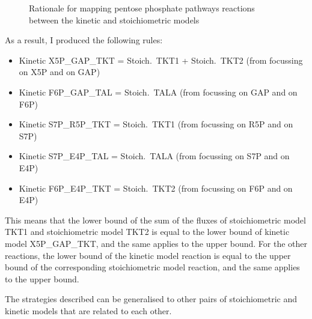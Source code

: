 \documentclass[a4paper, 12pt]{scrartcl}
\begin{document}
{\begin{figure}[h]
  \caption{Rationale for mapping pentose phosphate pathways reactions between the kinetic and stoichiometric models}
  \label{fig:pppmapping}
\end{figure}


As a result, I produced the following rules:
\begin{itemize}
\item Kinetic X5P\_GAP\_TKT = Stoich.\ TKT1 + Stoich.\ TKT2 (from focussing on X5P and on GAP)
\item Kinetic F6P\_GAP\_TAL = Stoich.\ TALA (from focussing on GAP and on F6P)
\item Kinetic S7P\_R5P\_TKT = Stoich.\ TKT1 (from focussing on R5P and on S7P)
\item Kinetic S7P\_E4P\_TAL = Stoich.\ TALA (from focussing on S7P and on E4P)
  \item Kinetic F6P\_E4P\_TKT = Stoich.\ TKT2 (from focussing on F6P and on E4P)
  \end{itemize}

  This means that the lower bound of the sum of the fluxes of stoichiometric model TKT1 and stoichiometric model TKT2 is equal to the lower bound of kinetic model X5P\_GAP\_TKT, and the same applies to the upper bound. For the other reactions, the lower bound of the kinetic model reaction is equal to the upper bound of the corresponding stoichiometric model reaction, and the same applies to the upper bound.

  The strategies described can be generalised to other pairs of stoichiometric and kinetic models that are related to each other.

}
\end{document}
